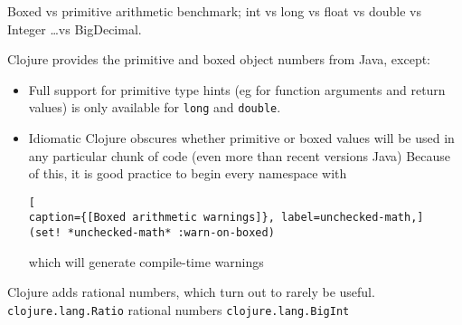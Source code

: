 Boxed vs primitive arithmetic benchmark; 
int vs long vs float vs double vs Integer \ldots vs BigDecimal.


\lstset{language=Clojure}

Clojure provides the primitive and boxed object numbers from Java,
except:
\begin{itemize}
  \item Full support for primitive type hints (eg for function arguments and
  return values) is only available for \lstinline|long| and \lstinline|double|.
  \item Idiomatic Clojure obscures whether primitive or boxed values will be
  used in any particular chunk of code (even more than recent versions  Java)
  Because of this, it is good practice to begin every namespace with
\begin{lstlisting}[
caption={[Boxed arithmetic warnings]}, label=unchecked-math,]  
(set! *unchecked-math* :warn-on-boxed)
\end{lstlisting}
which will generate compile-time warnings
\end{itemize}

Clojure adds rational numbers, which turn out to rarely be useful.\\
\lstinline|clojure.lang.Ratio| rational numbers
\lstinline|clojure.lang.BigInt|~\cite[p.~428]{Emerick2012ClojureProgramming}
